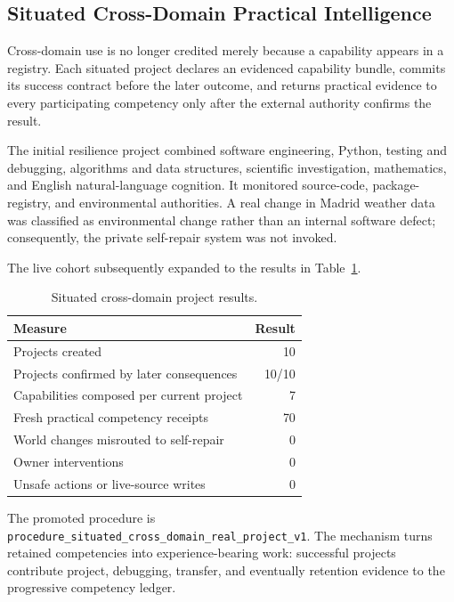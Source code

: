 \subsection{Situated Cross-Domain Practical Intelligence}
\label{subsec:situated-cross-domain-projects}

Cross-domain use is no longer credited merely because a capability appears in
a registry.  Each situated project declares an evidenced capability bundle,
commits its success contract before the later outcome, and returns practical
evidence to every participating competency only after the external authority
confirms the result.

The initial resilience project combined software engineering, Python, testing
and debugging, algorithms and data structures, scientific investigation,
mathematics, and English natural-language cognition.  It monitored source-code,
package-registry, and environmental authorities.  A real change in Madrid
weather data was classified as environmental change rather than an internal
software defect; consequently, the private self-repair system was not invoked.

The live cohort subsequently expanded to the results in
Table~\ref{tab:situated-project-results}.

\begin{table}[htbp]
\centering
\caption{Situated cross-domain project results.}
\label{tab:situated-project-results}
\begin{tabular}{@{}lr@{}}
\toprule
Measure & Result \\
\midrule
Projects created & 10 \\
Projects confirmed by later consequences & 10/10 \\
Capabilities composed per current project & 7 \\
Fresh practical competency receipts & 70 \\
World changes misrouted to self-repair & 0 \\
Owner interventions & 0 \\
Unsafe actions or live-source writes & 0 \\
\bottomrule
\end{tabular}
\end{table}

The promoted procedure is
\texttt{procedure\_situated\_cross\_domain\_real\_project\_v1}.  The mechanism
turns retained competencies into experience-bearing work: successful projects
contribute project, debugging, transfer, and eventually retention evidence to
the progressive competency ledger.

